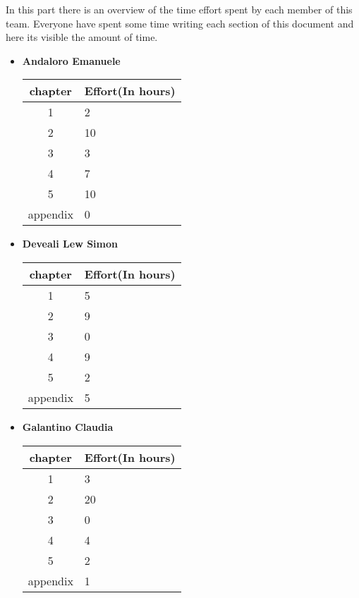 In this part there is an overview of the time effort spent by each member of this team. Everyone have spent some time writing each section of this document and here its visible the amount of time.\\
\begin{itemize}
    

\item  \textbf{Andaloro Emanuele}
\begin{table}[h!]
    \centering
    \begin{tabular}{|c|p{10cm}|}
        \hline
        \textbf{chapter} & \textbf{Effort(In hours)} \\
        \hline
        1 & 2 \\
        \hline
        2 & 10\\
        \hline
        3 & 3\\
        \hline
        4 & 7 \\
        \hline 
        5 & 10 \\
        \hline
        appendix & 0 \\
        \hline
    \end{tabular}
    \end{table}


\item  \textbf{Deveali Lew Simon}
\begin{table}[h!]
    \centering
    \begin{tabular}{|c|p{10cm}|}
        \hline
        \textbf{chapter} & \textbf{Effort(In hours)} \\
        \hline
        1 & 5 \\
        \hline
        2 & 9\\
        \hline
        3 & 0\\
        \hline
        4 & 9\\
        \hline 
        5 & 2 \\
        \hline
        appendix & 5 \\
        \hline
    \end{tabular}
    \end{table}



\item  \textbf{Galantino Claudia}
\begin{table}[h!]
    \centering
    \begin{tabular}{|c|p{10cm}|}
        \hline
        \textbf{chapter} & \textbf{Effort(In hours)} \\
        \hline
        1 & 3 \\
        \hline
        2 & 20\\
        \hline
        3 & 0\\
        \hline
        4 & 4\\
        \hline   
        5 & 2 \\
        \hline
        appendix & 1 \\
        \hline
    \end{tabular}
    \end{table}    


    
\end{itemize}



    




